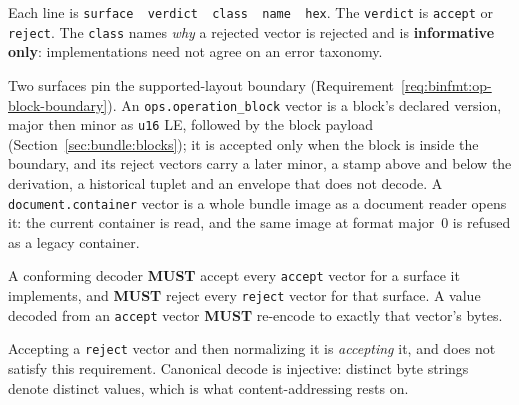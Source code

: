 \documentclass[11pt,letterpaper]{report}
\newcommand{\tablenums}[1]{{\addfontfeatures{Numbers={Lining,Tabular}}#1}}
\newcounter{requirement}[chapter]
\newcommand{\MUST}{\textbf{MUST}}
\newcommand{\ub}{\_\allowbreak}
\begin{document}
Each line is \texttt{surface\ \ verdict\ \ class\ \ name\ \ hex}. The
\texttt{verdict} is \texttt{accept} or \texttt{reject}. The \texttt{class}
names \emph{why} a rejected vector is rejected and is \textbf{informative
only}: implementations need not agree on an error taxonomy.

Two surfaces pin the supported-layout boundary
(Requirement~\ref{req:binfmt:op-block-boundary}). An
\texttt{ops.operation\ub block} vector is a block's declared version, major
then minor as \texttt{u16} LE, followed by the block payload
(Section~\ref{sec:bundle:blocks}); it is accepted only when the block is
inside the boundary, and its reject vectors carry a later minor, a stamp above
and below the derivation, a historical tuplet and an envelope that does not
decode. A \texttt{document.container} vector is a whole bundle image as a
document reader opens it: the current container is read, and the same image
at format major~\tablenums{0} is refused as a legacy container.

\begin{requirement}
  \label{req:binfmt:decode-vectors}
  A conforming decoder \MUST{} accept every \texttt{accept} vector for a
  surface it implements, and \MUST{} reject every \texttt{reject} vector for
  that surface. A value decoded from an \texttt{accept} vector \MUST{}
  re-encode to exactly that vector's bytes.

  Accepting a \texttt{reject} vector and then normalizing it is
  \emph{accepting} it, and does not satisfy this requirement. Canonical decode
  is injective: distinct byte strings denote distinct values, which is what
  content-addressing rests on.
\end{requirement}
\end{document}
